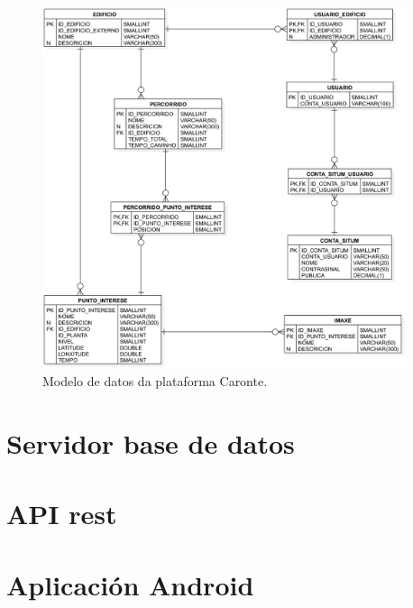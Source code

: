 \begin{figure}[tb] 
	\begin{center}
		\includegraphics[width=0.95\textwidth]{figures/BD/diagramaEntidadeRelacion}
		\caption{Modelo de datos da plataforma Caronte.}
		\label{fig:modelo_datos}
	\end{center}
\end{figure}


\section{Servidor base de datos}



\section{API rest}


\section{Aplicación Android}


